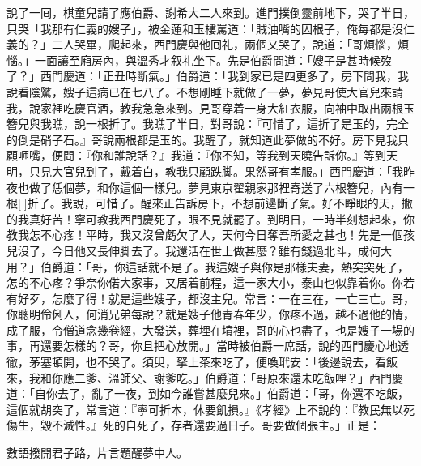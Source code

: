 說了一囘，棋童兒請了應伯爵、謝希大二人來到。進門撲倒靈前地下，{}哭了半日，只哭「我那有仁義的嫂子」，{}被金蓮和玉樓罵道：「賊油嘴的囚根子，俺每都是沒仁義的？」二人哭畢，爬起來，西門慶與他囘礼，兩個又哭了，說道：「哥煩惱，煩惱。」一面讓至廂房內，與溫秀才叙礼坐下。先是伯爵問道：「嫂子是甚時候歿了？」西門慶道：「正丑時斷氣。」伯爵道：「我到家已是四更多了，房下問我，我說看陰騭，嫂子這病已在七八了。不想剛睡下就做了一夢，{}夢見哥使大官兒來請我，說家裡吃慶官酒，教我急急來到。見哥穿着一身大紅衣服，向袖中取出兩根玉簪兒與我瞧，說一根折了。我瞧了半日，對哥說：『可惜了，這折了是玉的，完全的倒是硝子石。』{}哥說兩根都是玉的。{}我醒了，就知道此夢做的不好。房下見我只顧咂嘴，便問：『你和誰說話？』我道：『你不知，等我到天曉告訴你。』等到天明，只見大官兒到了，戴着白，教我只顧跌脚。{}果然哥有孝服。」西門慶道：「我昨夜也做了恁個夢，和你這個一樣兒。夢見東京翟親家那裡寄送了六根簪兒，內有一根[]折了。我說，可惜了。醒來正告訴房下，不想前邊斷了氣。好不睜眼的天，{}撇的我真好苦！寧可教我西門慶死了，眼不見就罷了。到明日，一時半刻想起來，你教我怎不心疼！平時，我又沒曾虧欠了人，{}天何今日奪吾所愛之甚也！先是一個孩兒沒了，今日他又長伸脚去了。我還活在世上做甚麼？雖有錢過北斗，成何大用？」伯爵道：「哥，你這話就不是了。我這嫂子與你是那樣夫妻，熱突突死了，怎的不心疼？爭奈你偌大家事，又居着前程，這一家大小，泰山也似靠着你。你若有好歹，怎麼了得！就是這些嫂子，都沒主兒。常言：一在三在，一亡三亡。哥，你聰明伶俐人，何消兄弟每說？就是嫂子他青春年少，你疼不過，越不過他的情，成了服，令僧道念幾卷經，大發送，葬埋在墳裡，哥的心也盡了，也是嫂子一場的事，再還要怎樣的？哥，你且把心放開。」{}當時被伯爵一席話，說的西門慶心地透徹，茅塞頓開，也不哭了。須臾，拏上茶來吃了，便喚玳安：「後邊說去，看飯來，我和你應二爹、溫師父、謝爹吃。」伯爵道：「哥原來還未吃飯哩？」西門慶道：「自你去了，亂了一夜，到如今誰嘗甚麼兒來。」伯爵道：「哥，你還不吃飯，這個就胡突了，常言道：『寧可折本，休要飢損。』《孝經》上不說的：『教民無以死傷生，毀不滅性。』{}死的自死了，存者還要過日子。哥要做個張主。」正是：

\begin{myquote} 
數語撥開君子路，片言題醒夢中人。
\end{myquote} 

